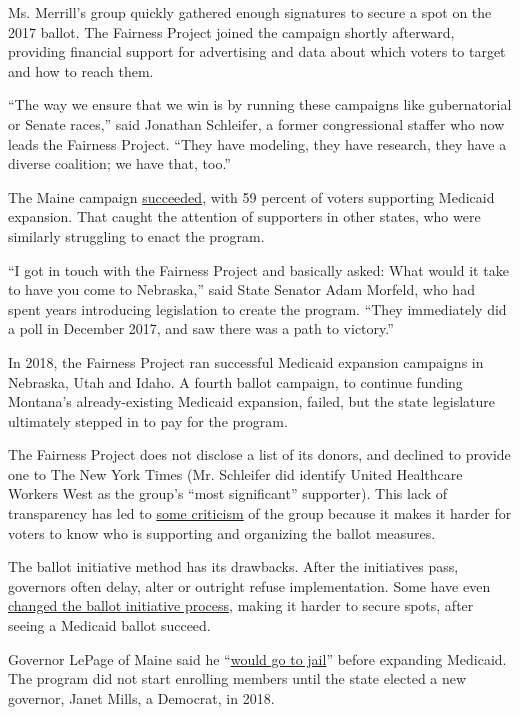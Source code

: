 Ms. Merrill's group quickly gathered enough signatures to secure a spot
on the 2017 ballot. The Fairness Project joined the campaign shortly
afterward, providing financial support for advertising and data about
which voters to target and how to reach them.

``The way we ensure that we win is by running these campaigns like
gubernatorial or Senate races,'' said Jonathan Schleifer, a former
congressional staffer who now leads the Fairness Project. ``They have
modeling, they have research, they have a diverse coalition; we have
that, too.''

The Maine campaign
\href{https://www.nytimes3xbfgragh.onion/elections/results/maine-ballot-measure-medicaid-expansion}{succeeded},
with 59 percent of voters supporting Medicaid expansion. That caught the
attention of supporters in other states, who were similarly struggling
to enact the program.

``I got in touch with the Fairness Project and basically asked: What
would it take to have you come to Nebraska,'' said State Senator Adam
Morfeld, who had spent years introducing legislation to create the
program. ``They immediately did a poll in December 2017, and saw there
was a path to victory.''

In 2018, the Fairness Project ran successful Medicaid expansion
campaigns in Nebraska, Utah and Idaho. A fourth ballot campaign, to
continue funding Montana's already-existing Medicaid expansion, failed,
but the state legislature ultimately stepped in to pay for the program.

The Fairness Project does not disclose a list of its donors, and
declined to provide one to The New York Times (Mr. Schleifer did
identify United Healthcare Workers West as the group's ``most
significant'' supporter). This lack of transparency has led to
\href{https://www.idahostatesman.com/news/politics-government/state-politics/article228258029.html}{some
criticism} of the group because it makes it harder for voters to know
who is supporting and organizing the ballot measures.

The ballot initiative method has its drawbacks. After the initiatives
pass, governors often delay, alter or outright refuse implementation.
Some have even
\href{https://www.idahostatesman.com/news/politics-government/state-politics/article227828559.html}{changed
the ballot initiative process}, making it harder to secure spots, after
seeing a Medicaid ballot succeed.

Governor LePage of Maine said he
``\href{https://apnews.com/b4ccacffb7e445c08f31c4fc444c2d85/LePage-says-he'd-risk-jail-before-Medicaid-puts-Maine-in-red}{would
go to jail}'' before expanding Medicaid. The program did not start
enrolling members until the state elected a new governor, Janet Mills, a
Democrat, in 2018.

